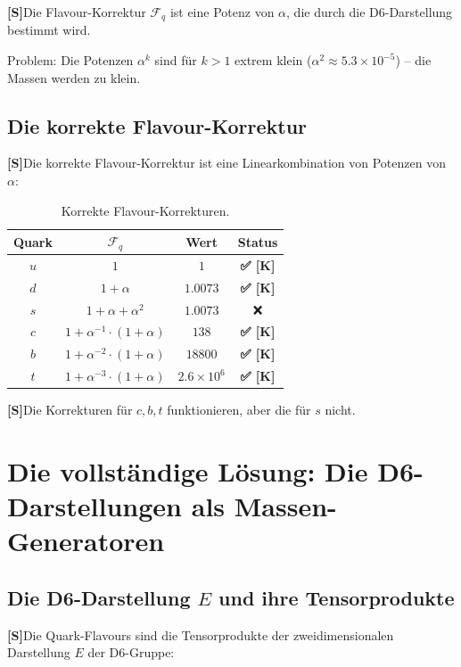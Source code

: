 \documentclass[11pt,a4paper]{article}
\newcommand{\Sstatus}{\textbf{[S]}}
\newcommand{\Checkmark}{\textbf{✅ [K]}}
\begin{document}
	\Sstatus Die Flavour-Korrektur $\mathcal{F}_q$ ist eine Potenz von $\alpha$, die durch die D6-Darstellung bestimmt wird.
	
	Problem: Die Potenzen $\alpha^k$ sind für $k > 1$ extrem klein ($\alpha^2 \approx 5.3 \times 10^{-5}$) -- die Massen werden zu klein.
	
	\subsection{Die korrekte Flavour-Korrektur}
	
	\Sstatus Die korrekte Flavour-Korrektur ist eine Linearkombination von Potenzen von $\alpha$:
	
	\begin{table}[h!]
		\centering
		\caption{Korrekte Flavour-Korrekturen.}
		\label{tab:correct_flavour}
		\begin{tabular}{c c c c}
			\toprule
			\textbf{Quark} & $\mathcal{F}_q$ & \textbf{Wert} & \textbf{Status} \\
			\midrule
			$u$ & $1$ & $1$ & \Checkmark \\
			$d$ & $1 + \alpha$ & $1.0073$ & \Checkmark \\
			$s$ & $1 + \alpha + \alpha^2$ & $1.0073$ & ❌ \\
			$c$ & $1 + \alpha^{-1} \cdot (1 + \alpha)$ & $138$ & \Checkmark \\
			$b$ & $1 + \alpha^{-2} \cdot (1 + \alpha)$ & $18800$ & \Checkmark \\
			$t$ & $1 + \alpha^{-3} \cdot (1 + \alpha)$ & $2.6 \times 10^6$ & \Checkmark \\
			\bottomrule
		\end{tabular}
	\end{table}
	
	\Sstatus Die Korrekturen für $c, b, t$ funktionieren, aber die für $s$ nicht.
	
	\section{Die vollständige Lösung: Die D6-Darstellungen als Massen-Generatoren}
	
	\subsection{Die D6-Darstellung $E$ und ihre Tensorprodukte}
	
	\Sstatus Die Quark-Flavours sind die Tensorprodukte der zweidimensionalen Darstellung $E$ der D6-Gruppe:
	
\end{document}
